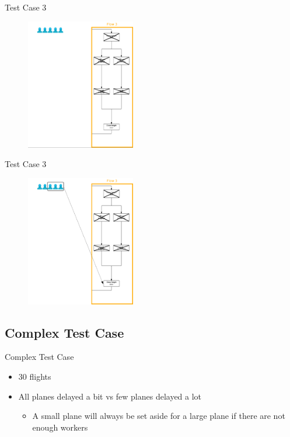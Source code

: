 \begin{frame}{Test Case 3}
\begin{figure}
    \centering
    \includegraphics[width=180px]{Grafik/Flow3/Flow3-5-1}
\end{figure}
\end{frame}

\begin{frame}{Test Case 3}
\begin{figure}
    \centering
    \includegraphics[width=180px]{Grafik/Flow3/Flow3-5}
\end{figure}
\end{frame}

\subsection{Complex Test Case}
\begin{frame}{Complex Test Case}
\begin{itemize}
\item 30 flights
\item All planes delayed a bit vs few planes delayed a lot
\begin{itemize}
\item A small plane will always be set aside for a large plane if there are not enough workers
\end{itemize}
\end{itemize}
\end{frame}

